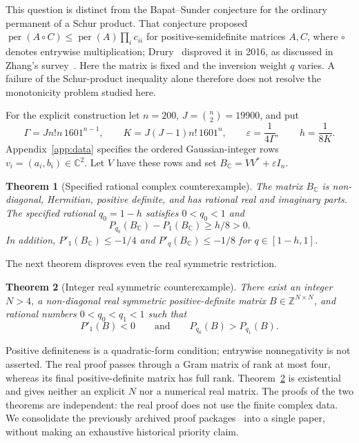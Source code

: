 \documentclass[11pt]{article}
\newtheorem{theorem}{Theorem}
\theoremstyle{remark}
\DeclareMathOperator{\per}{per}
\newcommand{\C}{\mathbb C}
\newcommand{\Z}{\mathbb Z}
\begin{document}
This question is distinct from the Bapat--Sunder conjecture for the
ordinary permanent of a Schur product. That conjecture proposed
$\per(A\circ C)\le\per(A)\prod_i c_{ii}$ for positive-semidefinite
matrices $A,C$, where $\circ$ denotes entrywise multiplication;
Drury~\cite{Drury2016} disproved it in 2016, as discussed in
Zhang's survey~\cite{ZhangSurvey}. Here the matrix is fixed and the
inversion weight $q$ varies. A failure of the Schur-product inequality
alone therefore does not resolve the monotonicity problem studied here.

For the explicit construction let $n=200$, $J=\binom n2=19900$, and put
\begin{equation}\label{eq:explicitconstants}
 \Gamma=Jn!n\,1601^{n-1},\qquad K=J(J-1)n!\,1601^n,
 \qquad \varepsilon=\frac1{4\Gamma},\qquad h=\frac1{8K}.
\end{equation}
Appendix~\ref{app:data} specifies the ordered Gaussian-integer rows
$v_i=(a_i,b_i)\in\C^2$. Let $V$ have these rows and set
$B_{\C}=VV^*+\varepsilon I_n$.

\begin{theorem}[Specified rational complex counterexample]\label{thm:complex}
The matrix $B_{\C}$ is non-diagonal, Hermitian, positive definite, and
has rational real and imaginary parts. The specified rational
$q_0=1-h$ satisfies $0<q_0<1$ and
\[
 P_{q_0}(B_{\C})-P_1(B_{\C})\ge h/8>0.
\]
In addition, $P'_1(B_{\C})\le-1/4$ and
$P'_q(B_{\C})\le-1/8$ for $q\in[1-h,1]$.
\end{theorem}

The next theorem disproves even the real symmetric restriction.
\begin{theorem}[Integer real symmetric counterexample]\label{thm:main}
There exist an integer $N>4$, a non-diagonal real symmetric
positive-definite matrix $B\in\Z^{N\times N}$, and rational numbers
$0<q_0<q_1<1$ such that
\[
 P'_1(B)<0\qquad\text{and}\qquad P_{q_0}(B)>P_{q_1}(B).
\]
\end{theorem}

Positive definiteness is a quadratic-form condition; entrywise
nonnegativity is not asserted. The real proof passes through a Gram
matrix of rank at most four, whereas its final positive-definite matrix
has full rank. Theorem~\ref{thm:main} is existential and gives neither an
explicit $N$ nor a numerical real matrix. The proofs of the two theorems
are independent: the real proof does not use the finite complex data.
We consolidate the previously archived proof packages~\cite{ComplexLean,RealLean}
into a single paper, without making an exhaustive historical priority claim.
\end{document}

